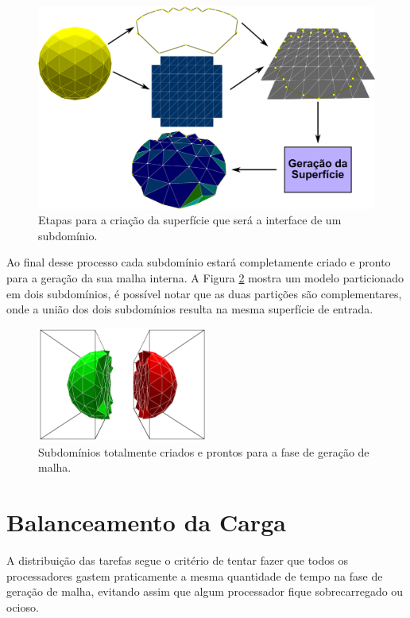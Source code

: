 \begin{figure}[!ht]
	\centering
	\includegraphics[width=1.0\textwidth]{fig/geracao_tridimensional.png}
	\caption{Etapas para a criação da superfície que será a interface de um subdomínio.}
	\label{fig:geracao_tridimensional}
\end{figure}

Ao final desse processo cada subdomínio estará completamente criado e pronto para a geração da sua malha interna. A Figura \ref{fig:subdominios3D_montados} mostra um modelo particionado em dois subdomínios, é possível notar que as duas partições são complementares, onde a união dos dois subdomínios resulta na mesma superfície de entrada.

\begin{figure}[!ht]
	\centering
	\includegraphics[width=0.5\textwidth]{fig/subdominios3D_montados.png}
	\caption{Subdomínios totalmente criados e prontos para a fase de geração de malha.}
	\label{fig:subdominios3D_montados}
\end{figure}


\section{Balanceamento da Carga}
\label{sec:Balanceamento_de_Carga}


A distribuição das tarefas segue o critério de tentar fazer que todos os processadores gastem praticamente a mesma quantidade de tempo na fase de geração de malha, evitando assim que algum processador fique sobrecarregado ou ocioso.

